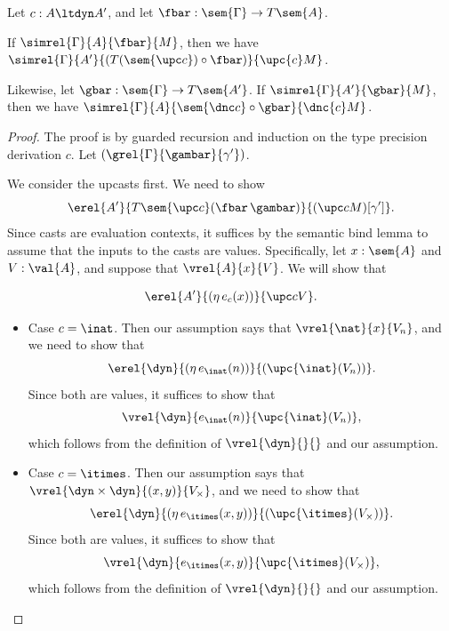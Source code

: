\begin{lemma}
    Let $c : A \ltdyn A'$, and let $\fbar : \sem{\Gamma} \to T\sem{A}$.
   
    If $\simrel{\Gamma}{A}{\fbar}{M}$, then we have
    $\simrel{\Gamma}{A'}{(T(\sem{\upc c}) \circ \fbar)}{\upc{c} M}$.

    Likewise, let $\gbar : \sem{\Gamma} \to T\sem{A'}$.
    If $\simrel{\Gamma}{A'}{\gbar}{M}$, then we have
    $\simrel{\Gamma}{A}{\sem{\dnc c} \circ \gbar}{\dnc{c} M}$.
\end{lemma}
\begin{proof}
    The proof is by guarded recursion and induction on the type precision
    derivation $c$. Let $(\grel{\Gamma}{\gambar}{\gamma'})$.

    We consider the upcasts first. We need to show
    \[ \erel {A'} {T\sem{\upc c} (\fbar\, \gambar)} {(\upc c M)[\gamma']}. \]
    Since casts are evaluation contexts, it suffices by the semantic bind lemma
    to assume that the inputs to the casts are values.
    Specifically, let $x : \sem{A}$ and $V : \val{A}$, and suppose that $\vrel{A}{x}{V}$.
    We will show that

    \[ \erel{A'}{(\eta\, e_c(x))} {\upc c V}.  \]

    \begin{itemize}
        \item Case $c = \inat$. Then our assumption says that $\vrel{\nat}{x}{V_n}$, and we need to show that
        \[ \erel {\dyn} {(\eta\, e_{\inat} (n))} {(\upc {\inat}(V_n))}. \]
        Since both are values, it suffices to show that 
        \[ \vrel{\dyn}{e_{\inat}(n)}{\upc {\inat}(V_n)}, \]
        which follows from the definition of $\vrel{\dyn}{}{}$ and our assumption.

        \item Case $c = \itimes$. Then our assumption says that $\vrel{\dyn \times \dyn}{(x, y)}{V_\times}$,
        and we need to show that
        \[ \erel {\dyn} {(\eta\, e_{\itimes}(x, y))} {(\upc {\itimes}(V_\times))}.  \]
        Since both are values, it suffices to show that
        \[ \vrel{\dyn}{e_{\itimes}(x, y)}{\upc {\itimes}(V_\times)}, \] 
        which follows from the definition of $\vrel{\dyn}{}{}$ and our assumption.
        
        

\end{itemize}
\end{proof}
